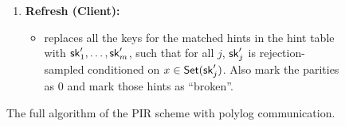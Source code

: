 {\begin{figure}[p]
\begin{minipage}{\textwidth}
\begin{mdframed}
\begin{enumerate}
\begin{enumerate}
            \item For each hint, do the following:
            \begin{itemize}
                \item if the hint is marked good, find the first unconsumed replacement entry $(r, \DB[r])$ from $x$'s chunk;
                and execute $\SingleQuery(x, \sk_j, p_j,r,\DB[r])$ and store the answer for the query.
                \item Otherwise, execute $\SingleQuery(x, \sk_j, 0,0,r')$ with a random index $r'$ from $x$'s chunk  and ignore the answer.
            \end{itemize}
                
            \item Return the answer of any of the good hints. If none of the hints were good, just return $0$.
            \end{enumerate}
    \item \textbf{Refresh (Client):}
    \begin{itemize}
        \item \Client replaces all the keys for the matched hints in the hint table with $\mathsf{sk}'_1,\dots,\mathsf{sk}'_m$, such that for all $j$, $\mathsf{sk}'_j$ is rejection-sampled conditioned on $x\in \mathsf{Set}(\mathsf{sk}'_j)$. Also mark the parities as $0$ and mark those hints as ``broken''.
    \end{itemize}
\end{enumerate}
\end{mdframed}
\end{minipage}
\caption{The full algorithm of the PIR scheme with polylog communication.}
\label{fig:piano:online}

\end{figure}
}
\fi
